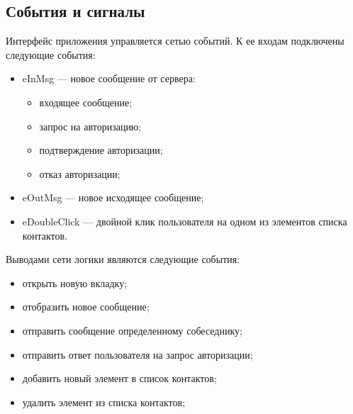 \subsection{События и сигналы}\label{events_and_signals}
Интерфейс приложения управляется сетью событий.
К ее входам подключены следующие события:
\begin{itemize}
    \item eInMsg --- новое сообщение от сервера:
    \begin{itemize}
        \item входящее сообщение;
        \item запрос на авторизацию;
        \item подтверждение авторизации;
        \item отказ авторизации;
    \end{itemize}
    \item eOutMsg --- новое исходящее сообщение;
    \item eDoubleClick --- двойной клик пользователя на одном из элементов списка контактов.
\end{itemize}
Выводами сети логики являются следующие события:
\begin{itemize}
    \item открыть новую вкладку;
    \item отобразить новое сообщение;
    \item отправить сообщение определенному собеседнику;
    \item отправить ответ пользователя на запрос авторизации;
    \item добавить новый элемент в список контактов;
    \item удалить элемент из списка контактов;
\end{itemize}



